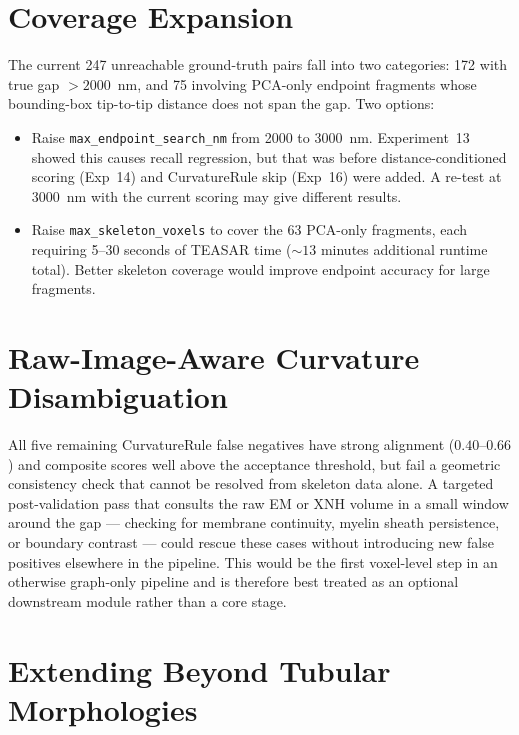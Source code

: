 \section{Coverage Expansion}

The current 247 unreachable ground-truth pairs fall into two categories: 172 with
true gap $> 2000$~nm, and 75 involving PCA-only endpoint fragments whose
bounding-box tip-to-tip distance does not span the gap. Two options:

\begin{itemize}
  \item Raise \texttt{max\_endpoint\_search\_nm} from 2000 to 3000~nm.
        Experiment~13 showed this causes recall regression, but that was before
        distance-conditioned scoring (Exp~14) and CurvatureRule skip (Exp~16)
        were added. A re-test at 3000~nm with the current scoring may give
        different results.

  \item Raise \texttt{max\_skeleton\_voxels} to cover the 63 PCA-only fragments,
        each requiring 5--30 seconds of TEASAR time ($\sim 13$ minutes additional
        runtime total). Better skeleton coverage would improve endpoint accuracy
        for large fragments.
\end{itemize}

\section{Raw-Image-Aware Curvature Disambiguation}

All five remaining CurvatureRule false negatives have strong alignment
($0.40$--$0.66$) and composite scores well above the acceptance threshold, but
fail a geometric consistency check that cannot be resolved from skeleton data
alone.  A targeted post-validation pass that consults the raw EM or XNH volume
in a small window around the gap --- checking for membrane continuity, myelin
sheath persistence, or boundary contrast --- could rescue these cases without
introducing new false positives elsewhere in the pipeline.  This would be the
first voxel-level step in an otherwise graph-only pipeline and is therefore
best treated as an optional downstream module rather than a core stage.

\section{Extending Beyond Tubular Morphologies}

